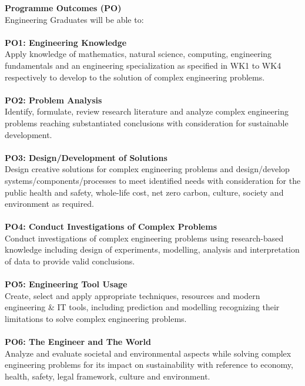 \textbf{Programme Outcomes (PO)} \\
Engineering Graduates will be able to: \\ \\

\textbf{PO1: Engineering Knowledge} \\
Apply knowledge of mathematics, natural science, computing, engineering fundamentals and an engineering specialization as specified in WK1 to WK4 respectively to develop to the solution of complex engineering problems. \\ \\

\textbf{PO2: Problem Analysis} \\
Identify, formulate, review research literature and analyze complex engineering problems reaching substantiated conclusions with consideration for sustainable development. \\ \\

\textbf{PO3: Design/Development of Solutions} \\
Design creative solutions for complex engineering problems and design/develop systems/components/processes to meet identified needs with consideration for the public health and safety, whole-life cost, net zero carbon, culture, society and environment as required. \\ \\

\textbf{PO4: Conduct Investigations of Complex Problems} \\
Conduct investigations of complex engineering problems using research-based knowledge including design of experiments, modelling, analysis and interpretation of data to provide valid conclusions. \\ \\

\textbf{PO5: Engineering Tool Usage} \\
Create, select and apply appropriate techniques, resources and modern engineering \& IT tools, including prediction and modelling recognizing their limitations to solve complex engineering problems. \\ \\

\textbf{PO6: The Engineer and The World} \\
Analyze and evaluate societal and environmental aspects while solving complex engineering problems for its impact on sustainability with reference to economy, health, safety, legal framework, culture and environment. \\ \\

